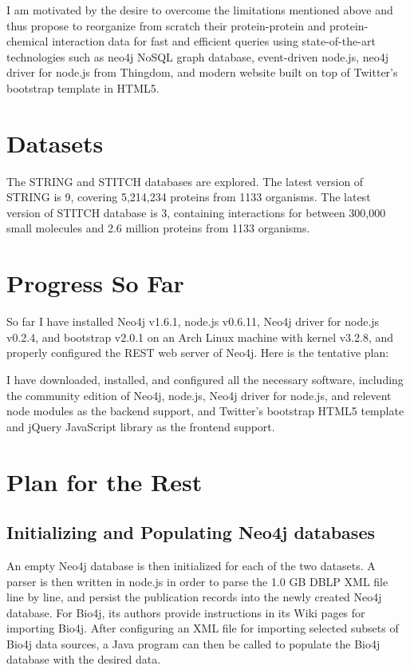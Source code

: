 \documentclass[10pt,conference,compsocconf]{../IEEEtran}
\begin{document}
I am motivated by the desire to overcome the limitations mentioned above and thus propose to reorganize from scratch their protein-protein and protein-chemical interaction data for fast and efficient queries using state-of-the-art technologies such as neo4j NoSQL graph database, event-driven node.js, neo4j driver for node.js from Thingdom, and modern website built on top of Twitter's bootstrap template in HTML5.

\section{Datasets}

The STRING and STITCH databases are explored. The latest version of STRING is 9, covering 5,214,234 proteins from 1133 organisms. The latest version of STITCH database is 3, containing interactions for between 300,000 small molecules and 2.6 million proteins from 1133 organisms.

\section{Progress So Far}

So far I have installed Neo4j v1.6.1, node.js v0.6.11, Neo4j driver for node.js v0.2.4, and bootstrap v2.0.1 on an Arch Linux machine with kernel v3.2.8, and properly configured the REST web server of Neo4j. Here is the tentative plan:

I have downloaded, installed, and configured all the necessary software, including the community edition of Neo4j, node.js, Neo4j driver for node.js, and relevent node modules as the backend support, and Twitter's bootstrap HTML5 template and jQuery JavaScript library as the frontend support.

\section{Plan for the Rest}

\subsection{Initializing and Populating Neo4j databases}

An empty Neo4j database is then initialized for each of the two datasets. A parser is then written in node.js in order to parse the 1.0 GB DBLP XML file line by line, and persist the publication records into the newly created Neo4j database. For Bio4j, its authors provide instructions in its Wiki pages for importing Bio4j. After configuring an XML file for importing selected subsets of Bio4j data sources, a Java program can then be called to populate the Bio4j database with the desired data.
\end{document}

